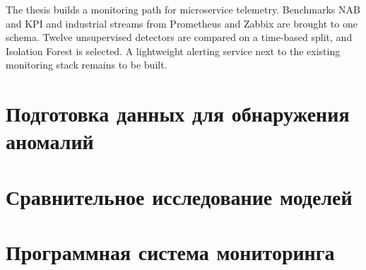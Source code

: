 \documentclass[master,paper]{imit-graduate}
\begin{document}


\begin{englishabstract}
The thesis builds a monitoring path for microservice telemetry.
Benchmarks NAB and KPI and industrial streams from Prometheus and Zabbix are brought to one schema.
Twelve unsupervised detectors are compared on a time-based split, and Isolation Forest is selected.
A lightweight alerting service next to the existing monitoring stack remains to be built.
\end{englishabstract}

\maketitlepage



\chapter{Подготовка данных для обнаружения аномалий}


\chapter{Сравнительное исследование моделей}


\chapter{Программная система мониторинга}


\conclusion


\printthebibliography
\end{document}
